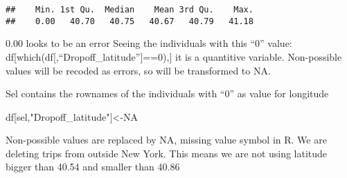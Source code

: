 \documentclass[
  18pt,
  a4paper]{article}
\newenvironment{Shaded}{\begin{snugshade}}{\end{snugshade}}
\newcommand{\CommentTok}[1]{\textcolor[rgb]{0.56,0.35,0.01}{\textit{#1}}}
\newcommand{\DecValTok}[1]{\textcolor[rgb]{0.00,0.00,0.81}{#1}}
\newcommand{\FloatTok}[1]{\textcolor[rgb]{0.00,0.00,0.81}{#1}}
\newcommand{\KeywordTok}[1]{\textcolor[rgb]{0.13,0.29,0.53}{\textbf{#1}}}
\newcommand{\NormalTok}[1]{#1}
\newcommand{\OperatorTok}[1]{\textcolor[rgb]{0.81,0.36,0.00}{\textbf{#1}}}
\newcommand{\OtherTok}[1]{\textcolor[rgb]{0.56,0.35,0.01}{#1}}
\newcommand{\StringTok}[1]{\textcolor[rgb]{0.31,0.60,0.02}{#1}}
\begin{document}
\begin{verbatim}
##    Min. 1st Qu.  Median    Mean 3rd Qu.    Max. 
##    0.00   40.70   40.75   40.67   40.79   41.18
\end{verbatim}

0.00 looks to be an error Seeing the individuals with this ``0'' value:
df{[}which(df{[},``Dropoff\_latitude''{]}==0),{]} it is a quantitive
variable. Non-possible values will be recoded as errors, so will be
transformed to NA.

\begin{Shaded}
\end{Shaded}

Sel contains the rownames of the individuals with ``0'' as value for
longitude

\begin{Shaded}
\begin{Highlighting}[]
\NormalTok{df[sel,}\StringTok{"Dropoff_latitude"}\NormalTok{]<-}\OtherTok{NA}   
\end{Highlighting}
\end{Shaded}

Non-possible values are replaced by NA, missing value symbol in R. We
are deleting trips from outside New York. This means we are not using
latitude bigger than 40.54 and smaller than 40.86

\begin{Shaded}
\end{Shaded}
\end{document}
